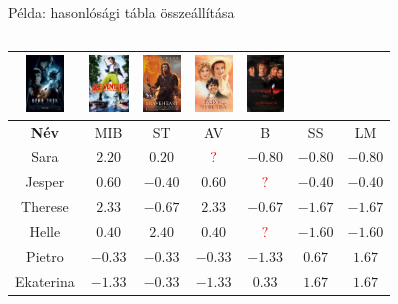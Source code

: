 \documentclass[english, aspectratio=169]{beamer}
\begin{document}
\begin{frame}{Példa: hasonlósági tábla összeállítása}
{\begin{columns}
\begin{column}{.8\textwidth}
\begin{center}
\begin{footnotesize}
\begin{tabular}{|c|c|c|c|c|c|c|}
\includegraphics[height=1.5cm, keepaspectratio]{images/movies/star_trek.png} &
\includegraphics[height=1.5cm, keepaspectratio]{images/movies/ace_ventura.png} &
\includegraphics[height=1.5cm, keepaspectratio]{images/movies/braveheart.png} &
\includegraphics[height=1.5cm, keepaspectratio]{images/movies/sense_and_sensibility.png} &
\includegraphics[height=1.5cm, keepaspectratio]{images/movies/les_miserables.png} \\
\hline
\textbf{Név} & MIB & ST & AV & B & SS & LM\\ 
\hline
Sara & $2.20$ & $0.20$ & \textcolor{red}{$?$} & $-0.80$ & $-0.80$ & $-0.80$\\ 
\hline
Jesper & $0.60$ & $-0.40$ & $0.60$ & \textcolor{red}{$?$} & $-0.40$ & $-0.40$\\ 
\hline
Therese & $2.33$ & $-0.67$ & $2.33$ & $-0.67$ & $-1.67$ & $-1.67$\\ 
\hline
Helle & $0.40$ & $2.40$ & $0.40$ & \textcolor{red}{$?$} & $-1.60$ & $-1.60$\\ 
\hline
Pietro & $-0.33$ & $-0.33$ & $-0.33$ & $-1.33$ & $0.67$ & $1.67$\\ 
\hline
Ekaterina & $-1.33$ & $-0.33$ & $-1.33$ & $0.33$ & $1.67$ & $1.67$\\ 
\hline
\end{tabular}
\end{footnotesize}
\end{center}
\end{column}
\end{columns}}
\end{frame}
\end{document}
